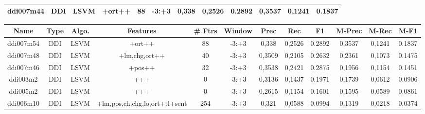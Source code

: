 \documentclass[a4paper]{article}
\begin{document}
\begin{landscape}
\begin{center}
\begin{tabular}{ |c|c|c|c|c|c|c|c|c|c|c|c|}
 	
 
 	
 		
 		\small{ ddi007m44 } & DDI & LSVM & +ort++  &  88 &  -3:+3  &  0,338 & 0,2526 & 0.2892  &  0,3537 & 0,1241 & 0.1837 \\
 		
 \hline
\end{tabular}
\end{center}




\begin{center}
\begin{tabular}{ |c|c|c|c|c|c|c|c|c|c|c|c|} 
 \hline
 	Name & Type & Algo. & Features & \# Ftrs & Window & Prec & Rec & F1 & M-Prec & M-Rec & M-F1\\
 \hline

 		

 	
 
 	
 		
 		\small{ ddi007m54 } & DDI & LSVM & +ort++  &  88 &  -3:+3  &  0,338 & 0,2526 & 0.2892  &  0,3537 & 0,1241 & 0.1837 \\
 		

 	
 
 	
 		
 		\small{ ddi007m48 } & DDI & LSVM & +lm,chg,ort++  &  40 &  -3:+3  &  0,3509 & 0,2105 & 0.2632  &  0,2361 & 0,1073 & 0.1475 \\
 		

 	
 
 	
 		
 		\small{ ddi007m46 } & DDI & LSVM & +pos++  &  32 &  -3:+3  &  0,3538 & 0,2421 & 0.2875  &  0,1956 & 0,1154 & 0.1451 \\
 		

 	
 
 	
 		
 		\small{ ddi003m2 } & DDI & LSVM & +++  &  0 &  -3:+3  &  0,3136 & 0,1437 & 0.1971  &  0,1739 & 0,0612 & 0.0906 \\
 		

 	
 
 	
 		
 		\small{ ddi005m2 } & DDI & LSVM & +++  &  0 &  -3:+3  &  0,2615 & 0,1154 & 0.1601  &  0,1595 & 0,0589 & 0.0861 \\
 		

 	
 
 	
 		
 		\small{ ddi006m10 } & DDI & LSVM & +lm,pos,ch,chg,lo,ort+tl+sent  &  254 &  -3:+3  &  0,321 & 0,0588 & 0.0994  &  0,1319 & 0,0218 & 0.0374 \\
 		


\end{tabular}
\end{center}
\end{landscape}
\end{document}
